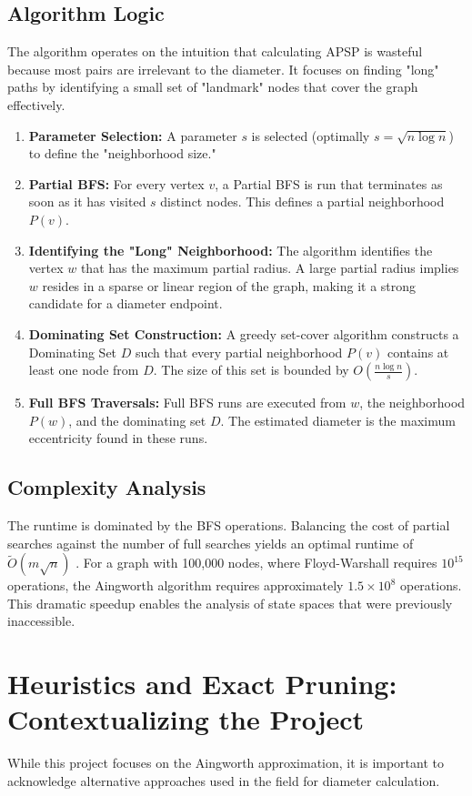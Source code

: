 \documentclass[12pt,a4paper]{report}
\begin{document}
\subsection{Algorithm Logic}
The algorithm operates on the intuition that calculating APSP is wasteful because most pairs are irrelevant to the diameter. It focuses on finding "long" paths by identifying a small set of "landmark" nodes that cover the graph effectively.
\begin{enumerate}
    \item \textbf{Parameter Selection:} A parameter $s$ is selected (optimally $s = \sqrt{n \log n}$) to define the "neighborhood size."
    \item \textbf{Partial BFS:} For every vertex $v$, a Partial BFS is run that terminates as soon as it has visited $s$ distinct nodes. This defines a partial neighborhood $P(v)$.
    \item \textbf{Identifying the "Long" Neighborhood:} The algorithm identifies the vertex $w$ that has the maximum partial radius. A large partial radius implies $w$ resides in a sparse or linear region of the graph, making it a strong candidate for a diameter endpoint.
    \item \textbf{Dominating Set Construction:} A greedy set-cover algorithm constructs a Dominating Set $D$ such that every partial neighborhood $P(v)$ contains at least one node from $D$. The size of this set is bounded by $O(\frac{n \log n}{s})$.
    \item \textbf{Full BFS Traversals:} Full BFS runs are executed from $w$, the neighborhood $P(w)$, and the dominating set $D$. The estimated diameter is the maximum eccentricity found in these runs.
\end{enumerate}

\subsection{Complexity Analysis}
The runtime is dominated by the BFS operations. Balancing the cost of partial searches against the number of full searches yields an optimal runtime of $\tilde{O}(m\sqrt{n})$ \cite{aingworth96}. For a graph with 100,000 nodes, where Floyd-Warshall requires $10^{15}$ operations, the Aingworth algorithm requires approximately $1.5 \times 10^8$ operations. This dramatic speedup enables the analysis of state spaces that were previously inaccessible.

\section{Heuristics and Exact Pruning: Contextualizing the Project}
While this project focuses on the Aingworth approximation, it is important to acknowledge alternative approaches used in the field for diameter calculation.
\end{document}
